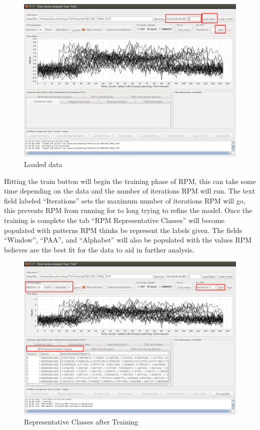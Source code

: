 \documentclass[titlepage, letterpaper, 12pt]{article}
\begin{document}
\begin{figure}[H]
	\includegraphics[width=\textwidth]{TSAT-training-step-4}
	\caption{Loaded data}
	\label{fig:TSAT-training-step-4}
\end{figure}

\newpage
Hitting the train button will begin the training phase of RPM, this can take some time depending on the data and the number of iterations RPM will run. The text field labeled ``Iterations'' sets the maximum number of iterations RPM will go, this prevents RPM from running for to long trying to refine the model. Once the training is complete the tab ``RPM Representative Classes'' will become populated with patterns RPM thinks be represent the labels given. The fields ``Window'', ``PAA'', and ``Alphabet'' will also be populated with the values RPM believes are the best fit for the data to aid in further analysis. 

\begin{figure}[H]
	\includegraphics[width=\textwidth]{TSAT-training-step-5}
	\caption{Representative Classes after Training}
	\label{fig:TSAT-training-step-5}
\end{figure}
\end{document}
